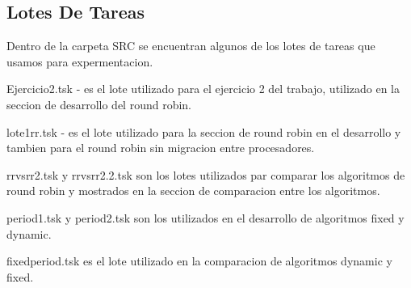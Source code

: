 
\subsection{Lotes De Tareas }

Dentro de la carpeta SRC se encuentran algunos de los lotes de tareas que usamos para expermentacion.

Ejercicio2.tsk - es el lote utilizado para el ejercicio 2 del trabajo, utilizado en la seccion de desarrollo del round robin.

lote1rr.tsk - es el lote utilizado para la seccion de round robin en el desarrollo y tambien para el round robin sin migracion entre procesadores.

rrvsrr2.tsk y rrvsrr2.2.tsk son los lotes utilizados par comparar los algoritmos de round robin y mostrados en la seccion de comparacion entre los algoritmos.

period1.tsk y period2.tsk son los utilizados en el desarrollo de algoritmos fixed y dynamic.

fixedperiod.tsk es el lote utilizado en la comparacion de algoritmos dynamic y fixed.


